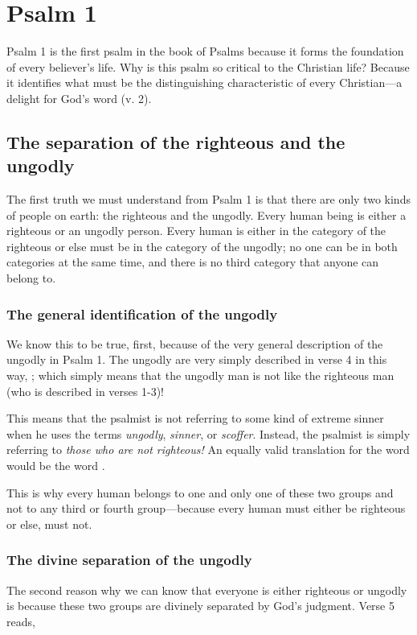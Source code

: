 \chapter{Psalm 1}
Psalm 1 is the first psalm in the book of Psalms
    because it forms the foundation of every believer's life.
Why is this psalm so critical to the Christian life?
Because it identifies what must be the distinguishing characteristic
    of every Christian---a delight for God's word (v. 2).

\section{The separation of the righteous and the ungodly}
The first truth we must understand from Psalm 1
    is that there are only two kinds of people on earth:
    the righteous and the ungodly.
Every human being is either a righteous or an ungodly person.
Every human is either in the category of the righteous or 
    else must be in the category of the ungodly;
    no one can be in both categories at the same time,
    and there is no third category that anyone can belong to.

\subsection{The general identification of the ungodly}
We know this to be true, first,
    because of the very general description of the ungodly in Psalm 1.
The ungodly are very simply described in verse 4 in this way, 
    ;
    which simply means that the ungodly man is not like the righteous man
    (who is described in verses 1-3)!

This means that the psalmist is not referring to some kind of extreme sinner
    when he uses the terms \emph{ungodly}, \emph{sinner}, or \emph{scoffer}.
Instead, the psalmist is simply referring to \emph{those who are not righteous!}
An equally valid translation for the word 
    would be the word .

This is why every human belongs to one and only one of these two groups
    and not to any third or fourth group---because 
    every human must either be righteous or else, must not.

\subsection{The divine separation of the ungodly}
The second reason why we can know that
    everyone is either righteous or ungodly is
    because these two groups are divinely separated by God's judgment.
Verse 5 reads,

